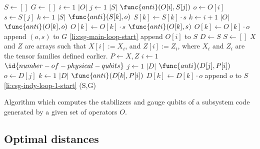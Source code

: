 \documentclass[twocolumn,showpacs,preprintnumbers,amsmath,amssymb,nofootinbib,pra,floatfix]{revtex4}
\begin{document}
\begin{table*}
\label{SG-algorithm}
\begin{codebox}
\li $S \gets []$
\li $G\gets []$
\li \For $i \gets 1$ \To $|O|$ \label{li:csg-main-loop-start}
\li \Do
\li      \For $j \gets 1$ \To $|S|$
\li      \Do
\li        \If $\func{anti}(O[i],S[j])$
\li        \Then
\li              $o \gets O[i]$
\li              $s \gets S[j]$
\li               \For $k \gets 1$ \To $|S|$
\li                   \Do
\li                        {} $\func{anti}(S[k],o)$  $S[k] \gets S[k]\cdot s$
                       \End 
\li               \For $k \gets i+1$ \To $|O|$
\li                  \Do
\li                        {} $\func{anti}(O[k],o)$  $O[k] \gets O[k]\cdot s$
\li                        {} $\func{anti}(O[k],s)$  $O[k] \gets O[k]\cdot o$
                       \End
\li             append $(o,s)$ to $G$
\li             \Goto \ref{li:csg-main-loop-start}
              \End
            \End
\li      append $O[i]$ to $S$
      \End
\li $D \gets S$
\li $S \gets []$
\zi \Comment $X$ and $Z$ are arrays such that
  $X[i]:=X_i$, and $Z[i]:=Z_i$, where $X_i$ and $Z_i$ are the tensor
  families defined earlier.
\li \For $P\gets X,Z$
\li \Do %
\li   \For $i \gets 1$ \To $\id{number-of-physical-qubits}$ \label{li:csg-indy-loop-1-start}
\li   \Do %
\li     \For $j \gets 1$ \To $|D|$
\li     \Do %
\li         \If $\func{anti}(D[j],P[i])$
\li         \Then
\li            $o \gets D[j]$
\li             \For $k \gets 1$ \To $|D|$
\li             \Do %
\li                 {} $\func{anti}(D[k],P[i])$  $D[k] \gets D[k]\cdot o$
                 \End %
\li             append $o$ to $S$
\li            \Goto \ref{li:csg-indy-loop-1-start}
              \End %
           \End %
          \End %
        \End %
\li \Return (S,G)
\end{codebox}
\caption{Algorithm which computes the stabilizers and gauge qubits of
  a subsystem code generated by a given set of operators $O$.}
\end{table*}
\subsection{Optimal distances}
\end{document}
